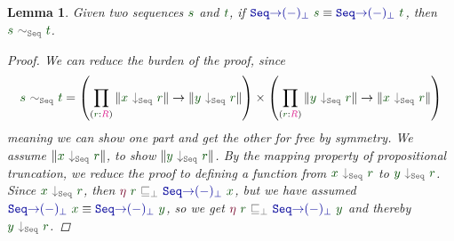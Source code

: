 \documentclass[twoside,11pt,openright]{report}
\theoremstyle{plain} %
\newtheorem{lem}[thm]{Lemma}
\theoremstyle{definition}
\theoremstyle{remark}
\newcommand*{\term}[1]{\textcolor{green!30!black}{#1}} %
\newcommand*{\type}[1]{\textcolor{magenta!90!black}{#1}}
\newcommand*{\relation}[1]{\textcolor{gray!75!black}{\ensuremath{\mathtt{#1}}}}
\newcommand*{\function}[1]{\textcolor{blue!60!black}{\ensuremath{\mathtt{#1}}}}
\newcommand*{\constructor}[1]{\textcolor{purple!60!black}{\ensuremath{\mathtt{#1}}}}
\begin{document}
\begin{lem}
  \label{lem:injectivity-lemma}
  Given two sequences \(\term{s}\) and \(\term{t}\), if \(\function{Seq{\rightarrow}(-)_\bot}~\term{s} \equiv \function{Seq{\rightarrow}(-)_\bot}~\term{t}\), then \(\term{s}~\relation{\sim_{Seq}}~\term{t}\).
  \begin{proof}
    We can reduce the burden of the proof, since
    \begin{equation}
      \term{s}~\relation{\sim_{Seq}}~\term{t} = \left(\prod_{(\term{r} : \type{R})} \| \term{x}~\relation{\downarrow_{Seq}}~\term{r} \| \rightarrow \| \term{y}~\relation{\downarrow_{Seq}}~\term{r} \|\right) \times \left(\prod_{(\term{r} : \type{R})} \| \term{y}~\relation{\downarrow_{Seq}}~\term{r} \| \rightarrow \| \term{x}~\relation{\downarrow_{Seq}}~\term{r} \|\right)
    \end{equation}
    meaning we can show one part and get the other for free by symmetry. We assume \(\| \term{x}~\relation{\downarrow_{Seq}}~\term{r} \|\), to show \(\| \term{y}~\relation{\downarrow_{Seq}}~\term{r} \|\). By the mapping property of propositional truncation, we reduce the proof to defining a function from \(\term{x}~\relation{\downarrow_{Seq}}~\term{r}\) to \(\term{y}~\relation{\downarrow_{Seq}}~\term{r}\). Since \(\term{x}~\relation{\downarrow_{Seq}}~\term{r}\), then \(\constructor{\eta}~\term{r}~\relation{\sqsubseteq_{\bot}}~\function{Seq{\rightarrow}(-)_\bot}~\term{x}\), but we have assumed \(\function{Seq{\rightarrow}(-)_\bot}~\term{x} \equiv \function{Seq{\rightarrow}(-)_\bot}~\term{y}\), so we get \(\constructor{\eta}~\term{r}~\relation{\sqsubseteq_{\bot}}~\function{Seq{\rightarrow}(-)_\bot}~\term{y}\) and thereby \(\term{y}~\relation{\downarrow_{Seq}}~\term{r}\).
  \end{proof}
\end{lem}
\end{document}
